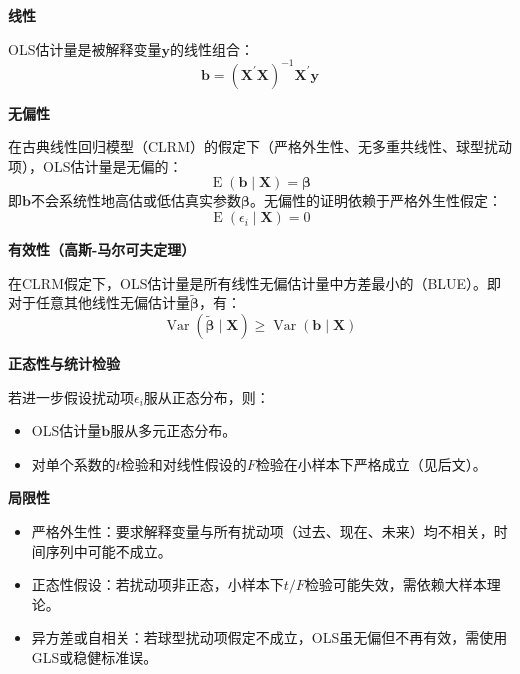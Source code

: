 \textbf{线性}
    
    OLS估计量是被解释变量$\mathbf{y}$的线性组合：
    \begin{equation}
        \mathbf{b} = (\mathbf{X}^{\prime}\mathbf{X})^{-1}\mathbf{X}^{\prime}\mathbf{y}
    \end{equation}

\textbf{无偏性}
    
    在古典线性回归模型（CLRM）的假定下（严格外生性、无多重共线性、球型扰动项），OLS估计量是无偏的：
    \begin{equation}
        \operatorname{E}(\mathbf{b} \mid \mathbf{X}) = \boldsymbol{\beta}
    \end{equation}
    即$\mathbf{b}$不会系统性地高估或低估真实参数$\boldsymbol{\beta}$。无偏性的证明依赖于严格外生性假定：
    \begin{equation}
        \operatorname{E}(\epsilon_i \mid \mathbf{X}) = 0
    \end{equation}

\textbf{有效性（高斯-马尔可夫定理）}
    
    在CLRM假定下，OLS估计量是所有线性无偏估计量中方差最小的（BLUE）。即对于任意其他线性无偏估计量$\tilde{\boldsymbol{\beta}}$，有：
    \begin{equation}
        \operatorname{Var}(\tilde{\boldsymbol{\beta}} \mid \mathbf{X}) \geq \operatorname{Var}(\mathbf{b} \mid \mathbf{X})
    \end{equation}

\textbf{正态性与统计检验}
    
    若进一步假设扰动项$\epsilon_i$服从正态分布，则：
    \begin{itemize}
        \item OLS估计量$\mathbf{b}$服从多元正态分布。
        \item 对单个系数的$t$检验和对线性假设的$F$检验在小样本下严格成立（见后文）。
    \end{itemize}

\textbf{局限性}
    \begin{itemize}
        \item 严格外生性：要求解释变量与所有扰动项（过去、现在、未来）均不相关，时间序列中可能不成立。
        \item 正态性假设：若扰动项非正态，小样本下$t/F$检验可能失效，需依赖大样本理论。
        \item 异方差或自相关：若球型扰动项假定不成立，OLS虽无偏但不再有效，需使用GLS或稳健标准误。
    \end{itemize}

